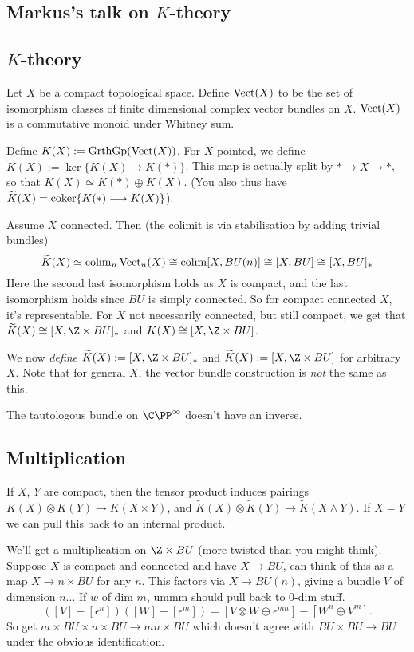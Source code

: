 \documentclass[11pt]{article}
\newcommand{\KanSemResponse}[1]
{
\thispagestyle{fancy}
\subsection*{#1}
}
\begin{document}
\begin{MarkusKtheory}
\KanSemResponse
{Markus's talk on $K$-theory}
\subsection*{$K$-theory}
Let $X$ be a compact topological space. Define $\operatorname{Vect}(X)$ to be the set of isomorphism classes of finite dimensional complex vector bundles on $X$. $\operatorname{Vect}(X)$ is a commutative monoid under Whitney sum.

Define $K(X):=\operatorname{GrthGp}(\operatorname{Vect}(X))$.
For $X$ pointed, we define $\widetilde K(X):=\ker\{K(X)\to K(\ast)\}$. This map is actually split by $\ast\to X\to \ast$, so that $K(X)\simeq K(\ast)\oplus\widetilde K(X)$. (You also thus have $\widetilde K(X)=\operatorname{coker}\{K(\ast)\longrightarrow K(X)\}$).

Assume $X$ connected. Then (the colimit is via stabilisation by adding trivial bundles) 
\[\widetilde K(X)\simeq \operatorname{colim}_n\operatorname{Vect}_n(X)\cong \operatorname{colim}[X,BU(n)]\cong[X,BU]\cong[X,BU]_*\]
Here the second last isomorphism holds as $X$ is compact, and the last isomorphism holds since $BU$ is simply connected.
So for compact connected $X$, it's representable. For $X$ not necessarily connected, but still compact, we get that $\widetilde K(X)\cong[X,\Z\times BU]_*$ and $K(X)\cong[X,\Z\times BU]$.

We now \emph{define} $\widetilde K(X):=[X,\Z\times BU]_*$ and $\widetilde K(X):=[X,\Z\times BU]$ for arbitrary $X$. Note that for general $X$, the vector bundle construction is \emph{not} the same as this. 
\begin{exmp*} The tautologous bundle on $\CP^\infty$ doesn't have an inverse.
\end{exmp*} 
\subsection*{Multiplication}
If $X$, $Y$ are compact, then the tensor product induces pairings $K(X)\otimes K(Y)\to K(X\times Y)$, and $\widetilde K(X)\otimes \widetilde K(Y)\to\widetilde K(X\wedge Y)$. If $X=Y$ we can pull this back to an internal product.

We'll get a multiplication on $\Z\times BU$ (more twisted than you might think). Suppose $X$ is compact and connected and have $X\to BU$, can think of this as a map $X\to n\times BU$ for any $n$. This factors via $X\to BU(n)$, giving a bundle $V$ of dimension $n$... If $w$ of dim $m$, ummm should pull back to $0$-dim stuff. 
\[([V]-[\epsilon^n])([W]-[\epsilon^m])=[V\otimes W\oplus\epsilon^{mn}]-[W^n\oplus V^m].\]
So get $m\times BU\times n\times BU\to mn\times BU$ which doesn't agree with $BU\times BU\to BU$ under the obvious identification.


\end{MarkusKtheory}
\end{document}
